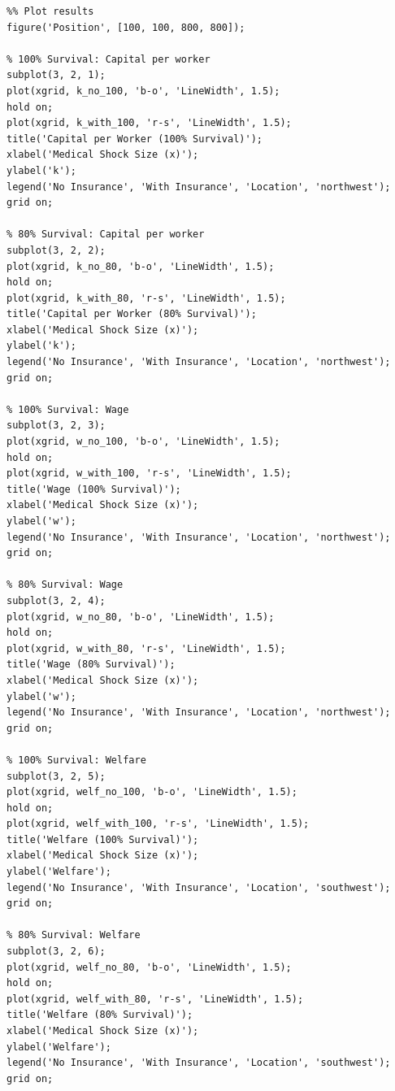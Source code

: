 \documentclass[10pt,a4paper]{article}
\begin{document}
\begin{lstlisting}
%% Plot results
figure('Position', [100, 100, 800, 800]);

% 100% Survival: Capital per worker
subplot(3, 2, 1);
plot(xgrid, k_no_100, 'b-o', 'LineWidth', 1.5);
hold on;
plot(xgrid, k_with_100, 'r-s', 'LineWidth', 1.5);
title('Capital per Worker (100% Survival)');
xlabel('Medical Shock Size (x)');
ylabel('k');
legend('No Insurance', 'With Insurance', 'Location', 'northwest');
grid on;

% 80% Survival: Capital per worker
subplot(3, 2, 2);
plot(xgrid, k_no_80, 'b-o', 'LineWidth', 1.5);
hold on;
plot(xgrid, k_with_80, 'r-s', 'LineWidth', 1.5);
title('Capital per Worker (80% Survival)');
xlabel('Medical Shock Size (x)');
ylabel('k');
legend('No Insurance', 'With Insurance', 'Location', 'northwest');
grid on;

% 100% Survival: Wage
subplot(3, 2, 3);
plot(xgrid, w_no_100, 'b-o', 'LineWidth', 1.5);
hold on;
plot(xgrid, w_with_100, 'r-s', 'LineWidth', 1.5);
title('Wage (100% Survival)');
xlabel('Medical Shock Size (x)');
ylabel('w');
legend('No Insurance', 'With Insurance', 'Location', 'northwest');
grid on;

% 80% Survival: Wage
subplot(3, 2, 4);
plot(xgrid, w_no_80, 'b-o', 'LineWidth', 1.5);
hold on;
plot(xgrid, w_with_80, 'r-s', 'LineWidth', 1.5);
title('Wage (80% Survival)');
xlabel('Medical Shock Size (x)');
ylabel('w');
legend('No Insurance', 'With Insurance', 'Location', 'northwest');
grid on;

% 100% Survival: Welfare
subplot(3, 2, 5);
plot(xgrid, welf_no_100, 'b-o', 'LineWidth', 1.5);
hold on;
plot(xgrid, welf_with_100, 'r-s', 'LineWidth', 1.5);
title('Welfare (100% Survival)');
xlabel('Medical Shock Size (x)');
ylabel('Welfare');
legend('No Insurance', 'With Insurance', 'Location', 'southwest');
grid on;

% 80% Survival: Welfare
subplot(3, 2, 6);
plot(xgrid, welf_no_80, 'b-o', 'LineWidth', 1.5);
hold on;
plot(xgrid, welf_with_80, 'r-s', 'LineWidth', 1.5);
title('Welfare (80% Survival)');
xlabel('Medical Shock Size (x)');
ylabel('Welfare');
legend('No Insurance', 'With Insurance', 'Location', 'southwest');
grid on;
\end{lstlisting}
\end{document}
